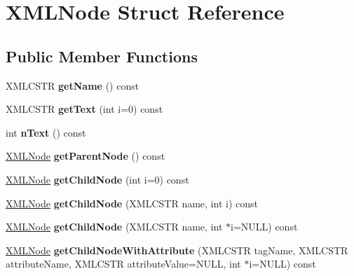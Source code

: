 \hypertarget{struct_x_m_l_node}{}\section{X\+M\+L\+Node Struct Reference}
\label{struct_x_m_l_node}
\subsection*{Public Member Functions}
\begin{DoxyCompactItemize}
\item 
\hypertarget{struct_x_m_l_node_a78f873d053775e62bbe7e9b9ba9a0893}{}\label{struct_x_m_l_node_a78f873d053775e62bbe7e9b9ba9a0893} 
X\+M\+L\+C\+S\+TR {\bfseries get\+Name} () const
\item 
\hypertarget{struct_x_m_l_node_acfe86b318bec6ed981ec2ede1b82a01c}{}\label{struct_x_m_l_node_acfe86b318bec6ed981ec2ede1b82a01c} 
X\+M\+L\+C\+S\+TR {\bfseries get\+Text} (int i=0) const
\item 
\hypertarget{struct_x_m_l_node_a1cab1484d301f5b99a5fc74a0b05b47e}{}\label{struct_x_m_l_node_a1cab1484d301f5b99a5fc74a0b05b47e} 
int {\bfseries n\+Text} () const
\item 
\hypertarget{struct_x_m_l_node_a4c1de07d0e519c6e1d54d855b47d9d6a}{}\label{struct_x_m_l_node_a4c1de07d0e519c6e1d54d855b47d9d6a} 
\hyperlink{struct_x_m_l_node}{X\+M\+L\+Node} {\bfseries get\+Parent\+Node} () const
\item 
\hypertarget{struct_x_m_l_node_ac34f1bdbf808d2ee89552415505bb673}{}\label{struct_x_m_l_node_ac34f1bdbf808d2ee89552415505bb673} 
\hyperlink{struct_x_m_l_node}{X\+M\+L\+Node} {\bfseries get\+Child\+Node} (int i=0) const
\item 
\hypertarget{struct_x_m_l_node_af082d930c7bc6f879ab282adbe48050f}{}\label{struct_x_m_l_node_af082d930c7bc6f879ab282adbe48050f} 
\hyperlink{struct_x_m_l_node}{X\+M\+L\+Node} {\bfseries get\+Child\+Node} (X\+M\+L\+C\+S\+TR name, int i) const
\item 
\hypertarget{struct_x_m_l_node_ae67a570d76c61d12d26a309f4c5645e2}{}\label{struct_x_m_l_node_ae67a570d76c61d12d26a309f4c5645e2} 
\hyperlink{struct_x_m_l_node}{X\+M\+L\+Node} {\bfseries get\+Child\+Node} (X\+M\+L\+C\+S\+TR name, int $\ast$i=N\+U\+LL) const
\item 
\hypertarget{struct_x_m_l_node_ad2665e479c488e525eba26659fe4034d}{}\label{struct_x_m_l_node_ad2665e479c488e525eba26659fe4034d} 
\hyperlink{struct_x_m_l_node}{X\+M\+L\+Node} {\bfseries get\+Child\+Node\+With\+Attribute} (X\+M\+L\+C\+S\+TR tag\+Name, X\+M\+L\+C\+S\+TR attribute\+Name, X\+M\+L\+C\+S\+TR attribute\+Value=N\+U\+LL, int $\ast$i=N\+U\+LL) const

\end{DoxyCompactItemize}
